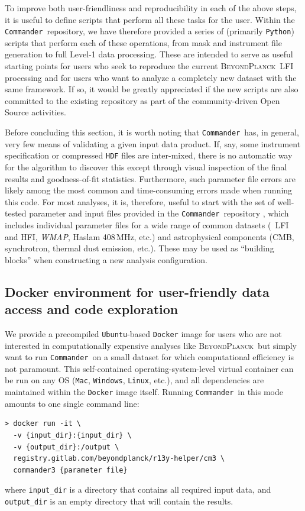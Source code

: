 \documentclass[twocolumn]{aa}
\def\WMAP{\textit{WMAP}}
\def\commander{\texttt{Commander}}
\newcommand{\BP}{\textsc{BeyondPlanck}}
\begin{document}
To improve both user-friendliness and reproducibility in each of the above steps, it is useful to define scripts that perform all these tasks for the user. Within the \commander\ repository, we have therefore provided a series of (primarily \texttt{Python}) scripts that perform each of these operations, from mask and instrument file generation to full Level-1 data processing. These are intended to serve as useful starting points for users who seek to reproduce the current \BP\ LFI processing and for users who want to analyze a completely new dataset with the same framework. If so, it would be greatly appreciated if the new scripts are also committed to the existing repository as part of the community-driven Open Source activities.

Before concluding this section, it is worth noting that \commander\ has, in general, very few means of validating a given input data product. If, say, some instrument specification or compressed \texttt{HDF} files are inter-mixed, there is no automatic way for the algorithm to discover this except through visual inspection of the final results and goodness-of-fit statistics. Furthermore, such parameter file errors are likely among the most common and time-consuming errors made when running this code. For most analyses, it is, therefore, useful to start with the set of well-tested parameter and input files provided in the \commander\ repository \citep{BP03}, which includes individual parameter files for a wide range of common datasets (\Planck\ LFI and HFI, \WMAP, Haslam 408\,MHz, etc.) and astrophysical components (CMB, synchrotron, thermal dust emission, etc.). These may be used as ``building blocks'' when constructing a new analysis configuration.


\subsection{Docker environment for user-friendly data access and code exploration}

We provide a precompiled \texttt{Ubuntu}-based \texttt{Docker} image for users who are not interested in computationally expensive analyses like \BP\ but simply want to run \commander\ on a small dataset for which computational efficiency is not paramount. This self-contained operating-system-level virtual container can be run on any OS (\texttt{Mac}, \texttt{Windows}, \texttt{Linux}, etc.), and all dependencies are maintained within the \texttt{Docker} image itself. Running \commander\ in this mode amounts to one single command line:
{\small
\begin{verbatim}
> docker run -it \
  -v {input_dir}:{input_dir} \
  -v {output_dir}:/output \
  registry.gitlab.com/beyondplanck/r13y-helper/cm3 \
  commander3 {parameter file}
\end{verbatim}
}
\noindent where \texttt{input\_dir} is a directory that contains all required
input data, and \texttt{output\_dir} is an empty directory that will
contain the results. 
\end{document}
